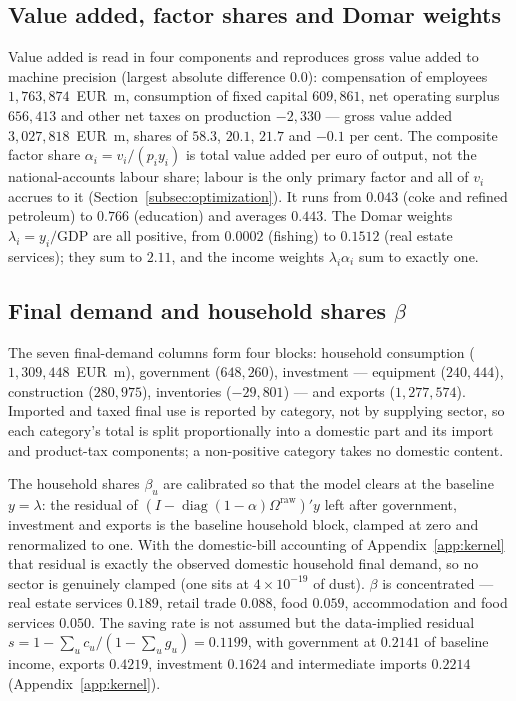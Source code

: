 \subsection{Value added, factor shares and Domar weights}\label{app:pipeline-va}

Value added is read in four components and reproduces gross value added to
machine precision (largest absolute difference $0.0$): compensation of employees
$1{,}763{,}874$~EUR~m, consumption of fixed capital $609{,}861$, net operating
surplus $656{,}413$ and other net taxes on production $-2{,}330$ --- gross
value added $3{,}027{,}818$~EUR~m, shares of $58.3$, $20.1$, $21.7$ and $-0.1$
per cent. The composite factor share
$\alpha_i=v_i/(p_iy_i)$ is total value added per euro of output, not the
national-accounts labour share; labour is the only primary factor and all of
$v_i$ accrues to it (Section~\ref{subsec:optimization}). It runs
from $0.043$ (coke and refined petroleum) to $0.766$ (education) and averages
$0.443$. The Domar weights $\lambda_i=y_i/\text{GDP}$ are all positive, from
$0.0002$ (fishing) to $0.1512$ (real estate services); they sum to $2.11$, and
the income weights $\lambda_i\alpha_i$ sum to exactly one.

\subsection{Final demand and household shares $\beta$}\label{app:pipeline-fd}

The seven final-demand columns form four blocks: household consumption
($1{,}309{,}448$~EUR~m), government ($648{,}260$), investment --- equipment
($240{,}444$), construction ($280{,}975$), inventories ($-29{,}801$) --- and
exports ($1{,}277{,}574$). Imported and taxed final use is reported by
category, not by supplying sector, so each category's total is split
proportionally into a domestic part and its import and product-tax components;
a non-positive category takes no domestic content.

The household shares $\beta_u$ are calibrated so that the model clears at the
baseline $y=\lambda$: the residual of
$(I-\operatorname{diag}(1-\alpha)\Omega^{\mathrm{raw}})'y$ left after government,
investment and exports is the baseline household block, clamped at zero and
renormalized to one. With the domestic-bill accounting of
Appendix~\ref{app:kernel} that residual is exactly the observed domestic
household final demand, so no sector is genuinely clamped (one sits at
$4\times10^{-19}$ of dust). $\beta$ is concentrated --- real estate services
$0.189$, retail trade $0.088$, food $0.059$, accommodation and food services
$0.050$. The saving rate is not assumed but the data-implied residual
$s=1-\sum_u c_u/(1-\sum_u g_u)=0.1199$, with government at $0.2141$ of baseline
income, exports $0.4219$, investment $0.1624$ and intermediate imports $0.2214$
(Appendix~\ref{app:kernel}).

